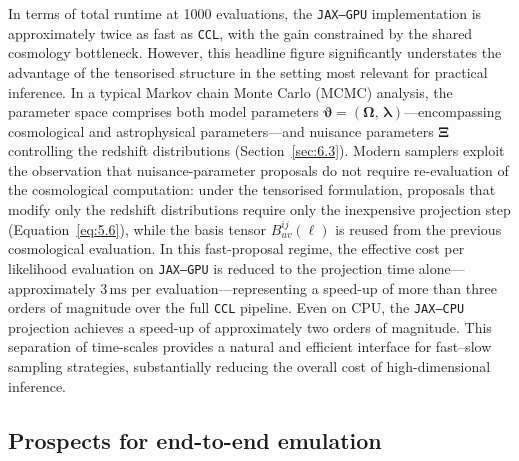 In terms of total runtime at 1000 evaluations, the \texttt{JAX--GPU} implementation is approximately twice as fast as \texttt{CCL}, with the gain constrained by the shared cosmology bottleneck. However, this headline figure significantly understates the advantage of the tensorised structure in the setting most relevant for practical inference. In a typical Markov chain Monte Carlo (MCMC) analysis, the parameter space comprises both model parameters \(\boldsymbol{\vartheta} = (\boldsymbol{\Omega},\, \boldsymbol{\lambda})\)---encompassing cosmological and astrophysical parameters---and nuisance parameters \(\boldsymbol{\Xi}\) controlling the redshift distributions (Section~\ref{sec:6.3}). Modern samplers exploit the observation that nuisance-parameter proposals do not require re-evaluation of the cosmological computation: under the tensorised formulation, proposals that modify only the redshift distributions require only the inexpensive projection step (Equation~\ref{eq:5.6}), while the basis tensor \(B_{uv}^{ij}(\ell)\) is reused from the previous cosmological evaluation. In this fast-proposal regime, the effective cost per likelihood evaluation on \texttt{JAX--GPU} is reduced to the projection time alone---approximately \(3\,\mathrm{ms}\) per evaluation---representing a speed-up of more than three orders of magnitude over the full \texttt{CCL} pipeline. Even on CPU, the \texttt{JAX--CPU} projection achieves a speed-up of approximately two orders of magnitude. This separation of time-scales provides a natural and efficient interface for fast--slow sampling strategies, substantially reducing the overall cost of high-dimensional inference.

\subsection{Prospects for end-to-end emulation} \label{sec:6.2}

